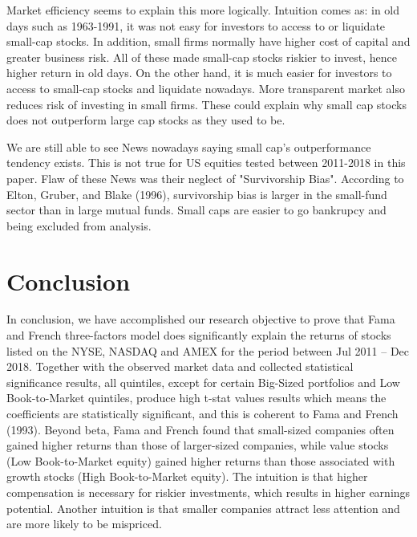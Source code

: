 \documentclass[12pt]{article}
\begin{document}
\noindent Market efficiency seems to explain this more logically. Intuition comes as: in old days such as 1963-1991, it was not easy for investors to access to or liquidate small-cap stocks. In addition, small firms normally have higher cost of capital and greater business risk. All of these made small-cap stocks riskier to invest, hence higher return in old days. On the other hand, it is much easier for investors to access to small-cap stocks and liquidate nowadays. More transparent market also reduces risk of investing in small firms. These could explain why small cap stocks does not outperform large cap stocks as they used to be.

\noindent We are still able to see News nowadays saying small cap's outperformance tendency exists. This is not true for US equities tested between 2011-2018 in this paper. Flaw of these News was their neglect of "Survivorship Bias". According to Elton, Gruber, and Blake (1996), survivorship bias is larger in the small-fund sector than in large mutual funds. Small caps are easier to go bankrupcy and being excluded from analysis. 


	\section{Conclusion} %
	\noindent In conclusion, we have accomplished our research objective to prove that Fama and French three-factors model does significantly explain the returns of stocks listed on the NYSE, NASDAQ and AMEX for the period between Jul 2011 – Dec 2018. Together with the observed market data and collected statistical significance results, all quintiles, except for certain Big-Sized portfolios and Low Book-to-Market quintiles, produce high t-stat values results which means the coefficients are statistically significant, and this is coherent to Fama and French (1993).  Beyond beta, Fama and French found that small-sized companies often gained higher returns than those of larger-sized companies, while value stocks (Low Book-to-Market equity) gained higher returns than those associated with growth stocks (High Book-to-Market equity). The intuition is that higher compensation is necessary for riskier investments, which results in higher earnings potential. Another intuition is that smaller companies attract less attention and are more likely to be mispriced.\\
	
\end{document}
